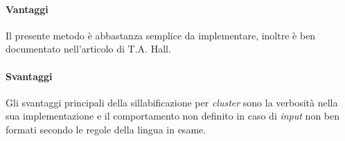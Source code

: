              \paragraph{Vantaggi} 
               Il presente metodo è abbastanza semplice da implementare, inoltre è ben documentato nell'articolo di T.A. Hall.
             \paragraph{Svantaggi} 
               Gli svantaggi principali della sillabificazione per \textit{cluster} sono la verbosità nella sua implementazione
               e il comportamento non definito in caso di \textit{input} non ben formati secondo le regole della lingua in esame.  
      \\

